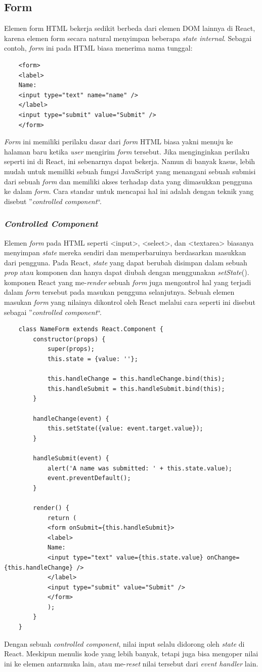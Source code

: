 \subsection{Form}
Elemen form HTML bekerja sedikit berbeda dari elemen DOM lainnya di React, karena elemen form secara natural menyimpan beberapa \textit{state internal}. Sebagai contoh, \textit{form} ini pada HTML biasa menerima nama tunggal:
\begin{lstlisting}
	<form>
	<label>
	Name:
	<input type="text" name="name" />
	</label>
	<input type="submit" value="Submit" />
	</form>
\end{lstlisting}
\textit{Form} ini memiliki perilaku dasar dari \textit{form} HTML biasa yakni menuju ke halaman baru ketika \textit{user} mengirim \textit{form} tersebut. Jika menginginkan perilaku seperti ini di React, ini sebenarnya dapat bekerja. Namun di banyak kasus, lebih mudah untuk memiliki sebuah fungsi JavaScript yang menangani sebuah submisi dari sebuah \textit{form} dan memiliki akses terhadap data yang dimasukkan pengguna ke dalam \textit{form}. Cara standar untuk mencapai hal ini adalah dengan teknik yang disebut ”\textit{controlled component}“.
\subsubsection{\textit{Controlled Component}}
Elemen \textit{form} pada HTML seperti <input>, <select>, dan <textarea> biasanya menyimpan \textit{state} mereka sendiri dan memperbaruinya berdasarkan masukkan dari pengguna. Pada React, \textit{state} yang dapat berubah disimpan dalam sebuah \textit{prop} atau komponen dan hanya dapat diubah dengan menggunakan \textit{setState}(). 
komponen React yang me-\textit{render} sebuah \textit{form} juga mengontrol hal yang terjadi dalam \textit{form} tersebut pada masukan pengguna selanjutnya. Sebuah elemen masukan \textit{form} yang nilainya dikontrol oleh React melalui cara seperti ini disebut sebagai ”\textit{controlled component}“.
\begin{lstlisting}
	class NameForm extends React.Component {
		constructor(props) {
			super(props);
			this.state = {value: ''};
			
			this.handleChange = this.handleChange.bind(this);
			this.handleSubmit = this.handleSubmit.bind(this);
		}
		
		handleChange(event) {
			this.setState({value: event.target.value});
		}
		
		handleSubmit(event) {
			alert('A name was submitted: ' + this.state.value);
			event.preventDefault();
		}
		
		render() {
			return (
			<form onSubmit={this.handleSubmit}>
			<label>
			Name:
			<input type="text" value={this.state.value} onChange={this.handleChange} />
			</label>
			<input type="submit" value="Submit" />
			</form>
			);
		}
	}
\end{lstlisting}
Dengan sebuah \textit{controlled component}, nilai input selalu didorong oleh \textit{state} di React. Meskipun menulis kode yang lebih banyak, tetapi juga bisa mengoper nilai ini ke elemen antarmuka lain, atau me-\textit{reset} nilai tersebut dari \textit{event handler} lain.
